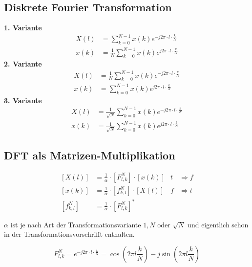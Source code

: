 \subsection*{Diskrete Fourier Transformation}
\begin{multicols}{2}
\textbf{1. Variante}
\begin{align*}
	X\left(l\right)&=\sum_{k=0}^{N-1}x\left(k\right)e^{-j2\pi\cdot l \cdot\frac{k}{N}}\\
	x\left(k\right)&=\frac{1}{N}\sum_{k=0}^{N-1}x\left(k\right)e^{j2\pi\cdot l \cdot\frac{k}{N}}
\end{align*}
\textbf{2. Variante}
\begin{align*}
	X\left(l\right)&=\frac{1}{N}\sum_{k=0}^{N-1}x\left(k\right)e^{-j2\pi\cdot l \cdot\frac{k}{N}}\\
	x\left(k\right)&=\sum_{k=0}^{N-1}x\left(k\right)e^{j2\pi\cdot l \cdot\frac{k}{N}}
\end{align*}
\textbf{3. Variante}
\begin{align*}
	X\left(l\right)&=\frac{1}{\sqrt{N}}\sum_{k=0}^{N-1}x\left(k\right)e^{-j2\pi\cdot l
	\cdot\frac{k}{N}}\\
	x\left(k\right)&=\frac{1}{\sqrt{N}}\sum_{k=0}^{N-1}x\left(k\right)e^{j2\pi\cdot l
	\cdot\frac{k}{N}}
\end{align*}
\vfill
\end{multicols}

\subsection*{DFT als Matrizen-Multiplikation}
\begin{align*}
\left[X\left(l\right)\right]&=\frac{1}{\alpha}\cdot\left[F_{l,k}^N\right]\cdot\left[x\left(k\right)\right]&t&\Rightarrow
f\\
\left[x\left(k\right)\right]&=\frac{1}{\alpha}\cdot\left[f_{k,l}^N\right]\cdot\left[X\left(l\right)\right]&f&\Rightarrow
t\\
\left[f_{k,l}^N\right]&=\frac{1}{\alpha}\cdot\left[F_{l,k}^N\right]^*
\end{align*}

\(\alpha \) ist je nach Art der Transformationsvariante \(1, N \text{ oder } \sqrt{N}\) und
eigentlich schon in der Transformationsvorschrifft enthalten.

\[
F_{l,k}^N=e^{-j2\pi \cdot l\cdot \frac{k}{N}} = \cos\left(2 \pi l \frac{k}{N}\right)-j\sin\left(2
\pi l \frac{k}{N}\right)
\]

